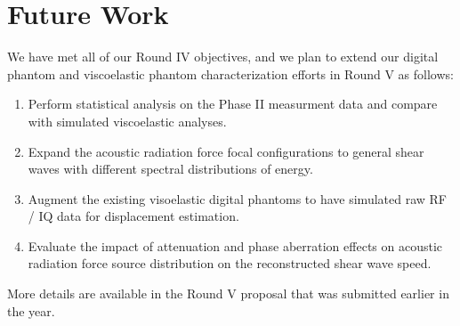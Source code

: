 \section{Future Work}\label{sect:future_work}

We have met all of our Round IV objectives, and we plan to extend our digital
phantom and viscoelastic phantom characterization efforts in Round V as
follows:

\begin{enumerate}
    \item Perform statistical analysis on the Phase II measurment data and
    compare with simulated viscoelastic analyses.
    \item Expand the acoustic radiation force focal configurations to general
    shear waves with different spectral distributions of energy.
    \item Augment the existing visoelastic digital phantoms to have simulated
    raw RF / IQ data for displacement estimation.
    \item Evaluate the impact of attenuation and phase aberration effects on
    acoustic radiation force source distribution on the reconstructed shear
    wave speed.
\end{enumerate}

More details are available in the Round V proposal that was submitted earlier in the year.
